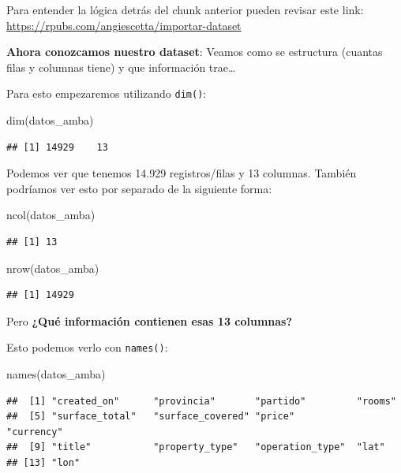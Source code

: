 \documentclass[
  spanish,
]{book}
\newenvironment{Shaded}{\begin{snugshade}}{\end{snugshade}}
\newcommand{\FunctionTok}[1]{\textcolor[rgb]{0.00,0.00,0.00}{#1}}
\newcommand{\NormalTok}[1]{#1}
\begin{document}
Para entender la lógica detrás del chunk anterior pueden revisar este link: \url{https://rpubs.com/angiescetta/importar-dataset}

\textbf{Ahora conozcamos nuestro dataset}: Veamos como se estructura (cuantas filas y columnas tiene) y que información trae\ldots{}

Para esto empezaremos utilizando \texttt{dim()}:

\begin{Shaded}
\begin{Highlighting}[]
\FunctionTok{dim}\NormalTok{(datos\_amba)}
\end{Highlighting}
\end{Shaded}

\begin{verbatim}
## [1] 14929    13
\end{verbatim}

Podemos ver que tenemos 14.929 registros/filas y 13 columnas. También podríamos ver esto por separado de la siguiente forma:

\begin{Shaded}
\begin{Highlighting}[]
\FunctionTok{ncol}\NormalTok{(datos\_amba)}
\end{Highlighting}
\end{Shaded}

\begin{verbatim}
## [1] 13
\end{verbatim}

\begin{Shaded}
\begin{Highlighting}[]
\FunctionTok{nrow}\NormalTok{(datos\_amba)}
\end{Highlighting}
\end{Shaded}

\begin{verbatim}
## [1] 14929
\end{verbatim}

Pero \textbf{¿Qué información contienen esas 13 columnas?}

Esto podemos verlo con \texttt{names()}:

\begin{Shaded}
\begin{Highlighting}[]
\FunctionTok{names}\NormalTok{(datos\_amba)}
\end{Highlighting}
\end{Shaded}

\begin{verbatim}
##  [1] "created_on"      "provincia"       "partido"         "rooms"          
##  [5] "surface_total"   "surface_covered" "price"           "currency"       
##  [9] "title"           "property_type"   "operation_type"  "lat"            
## [13] "lon"
\end{verbatim}
\end{document}
